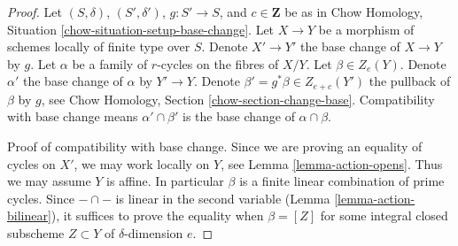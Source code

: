 \documentclass{stacks-project}
\theoremstyle{plain}
\theoremstyle{definition}
\theoremstyle{remark}
\numberwithin{equation}{subsection}
\begin{document}
\begin{proof}
Let $(S, \delta)$, $(S', \delta')$, $g : S' \to S$, and $c \in \mathbf{Z}$
be as in Chow Homology, Situation \ref{chow-situation-setup-base-change}.
Let $X \to Y$ be a morphism of schemes locally of finite type over $S$.
Denote $X' \to Y'$ the base change of $X \to Y$ by $g$.
Let $\alpha$ be a family of $r$-cycles on the fibres of $X/Y$.
Let $\beta \in Z_e(Y)$. Denote $\alpha'$ the
base change of $\alpha$ by $Y' \to Y$. Denote
$\beta' = g^*\beta \in Z_{e + c}(Y')$ the pullback of $\beta$ by $g$, see
Chow Homology, Section \ref{chow-section-change-base}.
Compatibility with base change means
$\alpha' \cap \beta'$ is the base change of $\alpha \cap \beta$.

\medskip\noindent
Proof of compatibility with base change.
Since we are proving an equality of cycles on $X'$, we may work locally
on $Y$, see Lemma \ref{lemma-action-opens}. Thus we may assume $Y$
is affine. In particular $\beta$ is a finite linear combination of prime
cycles. Since $- \cap -$ is linear in the second variable
(Lemma \ref{lemma-action-bilinear}), it suffices
to prove the equality when $\beta = [Z]$ for some integral closed subscheme
$Z \subset Y$ of $\delta$-dimension $e$.


\end{proof}
\end{document}
